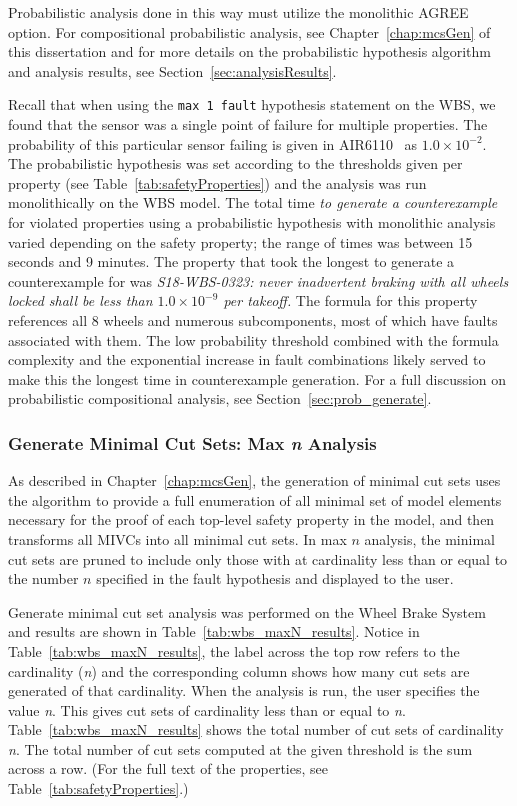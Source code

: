 Probabilistic analysis done in this way must utilize the monolithic AGREE option. For compositional probabilistic analysis, see Chapter~\ref{chap:mcsGen} of this dissertation and for more details on the probabilistic hypothesis algorithm and analysis results, see Section~\ref{sec:analysisResults}. 

Recall that when using the \texttt{max 1 fault} hypothesis statement on the WBS, we found that the sensor was a single point of failure for multiple properties. The probability of this particular sensor failing is given in AIR6110~\cite{AIR6110} as $1.0 \times 10^{-2}$. The probabilistic hypothesis was set according to the thresholds given per property (see Table~\ref{tab:safetyProperties}) and the analysis was run monolithically on the WBS model. The total time {\em to generate a counterexample} for violated properties using a probabilistic hypothesis with monolithic analysis varied depending on the safety property; the range of times was between 15 seconds and 9 minutes. The property that took the longest to generate a counterexample for was {\em S18-WBS-0323: never inadvertent braking with all wheels locked shall be less than $1.0 \times 10^{-9}$ per takeoff.} The formula for this property references all 8 wheels and numerous subcomponents, most of which have faults associated with them. The low probability threshold combined with the formula complexity and the exponential increase in fault combinations likely served to make this the longest time in counterexample generation. For a full discussion on probabilistic compositional analysis, see Section~\ref{sec:prob_generate}.

\subsubsection{Generate Minimal Cut Sets: Max \textit{n} Analysis}
\label{sec:maxN_generate}
As described in Chapter~\ref{chap:mcsGen}, the generation of minimal cut sets uses the \aivcalg algorithm to provide a full enumeration of all minimal set of model elements necessary for the proof of each top-level safety property in the model, and then transforms all MIVCs into all minimal cut sets. In max $n$ analysis, the minimal cut sets are pruned to include only those with at cardinality less than or equal to the number $n$ specified in the fault hypothesis and displayed to the user.

Generate minimal cut set analysis was performed on the Wheel Brake System and results are shown in Table~\ref{tab:wbs_maxN_results}. Notice in Table~\ref{tab:wbs_maxN_results}, the label across the top row refers to the cardinality (\textit{n}) and the corresponding column shows how many cut sets are generated of that cardinality. When the analysis is run, the user specifies the value \textit{n}. This gives cut sets of cardinality less than or equal to \textit{n}. Table~\ref{tab:wbs_maxN_results} shows the total number of cut sets of cardinality \textit{n}. The total number of cut sets computed at the given threshold is the sum across a row. (For the full text of the properties, see Table~\ref{tab:safetyProperties}.) 


